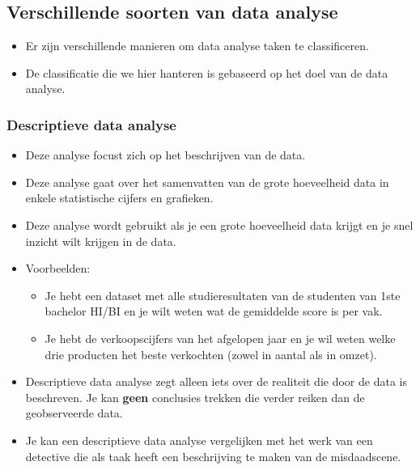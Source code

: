 \documentclass[]{tufte-book}
\providecommand{\tightlist}{%
  \setlength{\itemsep}{0pt}\setlength{\parskip}{0pt}}
\begin{document}
\hypertarget{verschillende-soorten-van-data-analyse}{%
\subsection{Verschillende soorten van data analyse}\label{verschillende-soorten-van-data-analyse}}

\begin{itemize}
\tightlist
\item
  Er zijn verschillende manieren om data analyse taken te classificeren.
\item
  De classificatie die we hier hanteren is gebaseerd op het doel van de data analyse.
\end{itemize}

\hypertarget{descriptieve-data-analyse}{%
\subsubsection*{Descriptieve data analyse}\label{descriptieve-data-analyse}}

\begin{itemize}
\tightlist
\item
  Deze analyse focust zich op het beschrijven van de data.
\item
  Deze analyse gaat over het samenvatten van de grote hoeveelheid data in enkele statistische cijfers en grafieken.
\item
  Deze analyse wordt gebruikt als je een grote hoeveelheid data krijgt en je snel inzicht wilt krijgen in de data.
\item
  Voorbeelden:

  \begin{itemize}
  \tightlist
  \item
    Je hebt een dataset met alle studieresultaten van de studenten van 1ste bachelor HI/BI en je wilt weten wat de gemiddelde score is per vak.
  \item
    Je hebt de verkoopscijfers van het afgelopen jaar en je wil weten welke drie producten het beste verkochten (zowel in aantal als in omzet).
  \end{itemize}
\item
  Descriptieve data analyse zegt alleen iets over de realiteit die door de data is beschreven. Je kan \textbf{geen} conclusies trekken die verder reiken dan de geobserveerde data.
\item
  Je kan een descriptieve data analyse vergelijken met het werk van een detective die als taak heeft een beschrijving te maken van de misdaadscene.
\end{itemize}
\end{document}
